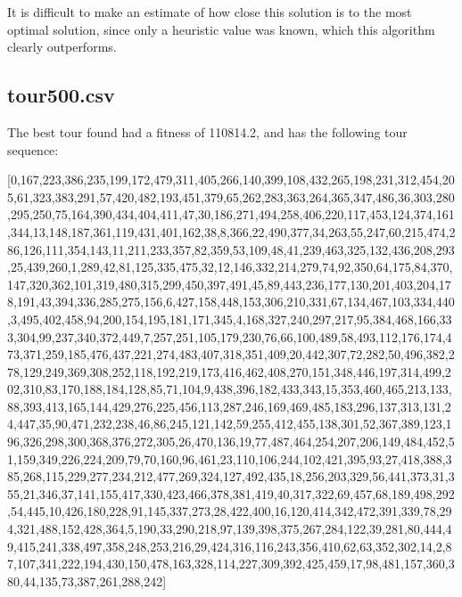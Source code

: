 \documentclass[a4paper,10pt]{article}
\newcommand{\ReplaceMe}[1]{{\color{blue}#1}}
\begin{document}
It is difficult to make an estimate of how close this solution is to the most optimal solution, since only a heuristic value was known, which this algorithm clearly outperforms.


\subsection{tour500.csv}


The best tour found had a fitness of 110814.2, and has the following tour sequence:

[0,167,223,386,235,199,172,479,311,405,266,140,399,108,432,265,198,231,312,454,205,61,323,383,291,57,420,482,193,451,379,65,262,283,363,264,365,347,486,36,303,280,295,250,75,164,390,434,404,411,47,30,186,271,494,258,406,220,117,453,124,374,161,344,13,148,187,361,119,431,401,162,38,8,366,22,490,377,34,263,55,247,60,215,474,286,126,111,354,143,11,211,233,357,82,359,53,109,48,41,239,463,325,132,436,208,293,25,439,260,1,289,42,81,125,335,475,32,12,146,332,214,279,74,92,350,64,175,84,370,147,320,362,101,319,480,315,299,450,397,491,45,89,443,236,177,130,201,403,204,178,191,43,394,336,285,275,156,6,427,158,448,153,306,210,331,67,134,467,103,334,440,3,495,402,458,94,200,154,195,181,171,345,4,168,327,240,297,217,95,384,468,166,333,304,99,237,340,372,449,7,257,251,105,179,230,76,66,100,489,58,493,112,176,174,473,371,259,185,476,437,221,274,483,407,318,351,409,20,442,307,72,282,50,496,382,278,129,249,369,308,252,118,192,219,173,416,462,408,270,151,348,446,197,314,499,202,310,83,170,188,184,128,85,71,104,9,438,396,182,433,343,15,353,460,465,213,133,88,393,413,165,144,429,276,225,456,113,287,246,169,469,485,183,296,137,313,131,24,447,35,90,471,232,238,46,86,245,121,142,59,255,412,455,138,301,52,367,389,123,196,326,298,300,368,376,272,305,26,470,136,19,77,487,464,254,207,206,149,484,452,51,159,349,226,224,209,79,70,160,96,461,23,110,106,244,102,421,395,93,27,418,388,385,268,115,229,277,234,212,477,269,324,127,492,435,18,256,203,329,56,441,373,31,355,21,346,37,141,155,417,330,423,466,378,381,419,40,317,322,69,457,68,189,498,292,54,445,10,426,180,228,91,145,337,273,28,422,400,16,120,414,342,472,391,339,78,294,321,488,152,428,364,5,190,33,290,218,97,139,398,375,267,284,122,39,281,80,444,49,415,241,338,497,358,248,253,216,29,424,316,116,243,356,410,62,63,352,302,14,2,87,107,341,222,194,430,150,478,163,328,114,227,309,392,425,459,17,98,481,157,360,380,44,135,73,387,261,288,242]
\end{document}
